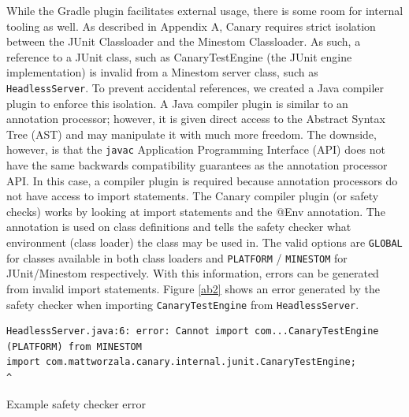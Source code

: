 \documentclass[12pt]{article}
\def\code#1{\texttt{#1}}
\begin{document}
\begin{onehalfspacing}











While the Gradle plugin facilitates external usage, there is some room
for internal tooling as well. As described in Appendix A, Canary
requires strict isolation between the JUnit Classloader and the Minestom
Classloader. As such, a reference to a JUnit class, such as
CanaryTestEngine (the JUnit engine implementation) is invalid from a
Minestom server class, such as \code{HeadlessServer}. To prevent accidental
references, we created a Java compiler plugin to enforce this isolation.
A Java compiler plugin is similar to an annotation processor; however,
it is given direct access to the Abstract Syntax Tree (AST) and may
manipulate it with much more freedom. The downside, however, is that the
\code{javac} Application Programming Interface (API) does not have the same
backwards compatibility guarantees as the annotation processor API. In
this case, a compiler plugin is required because annotation processors
do not have access to import statements. The Canary compiler plugin (or
safety checks) works by looking at import statements and the @Env
annotation. The annotation is used on class definitions and tells the
safety checker what environment (class loader) the class may be used in.
The valid options are \code{GLOBAL} for classes available in both class loaders
and \code{PLATFORM} / \code{MINESTOM} for JUnit/Minestom respectively. With this
information, errors can be generated from invalid import statements.
Figure \ref{ab2} shows an error generated by the safety checker when
importing \code{CanaryTestEngine} from \code{HeadlessServer}.

\begin{listing}[H]
\begin{verbatim}
HeadlessServer.java:6: error: Cannot import com...CanaryTestEngine (PLATFORM) from MINESTOM
import com.mattworzala.canary.internal.junit.CanaryTestEngine;
^
\end{verbatim}
\caption{Example safety checker error}
\label{lst:ab2}
\end{listing}






\end{onehalfspacing} %
\end{document}
